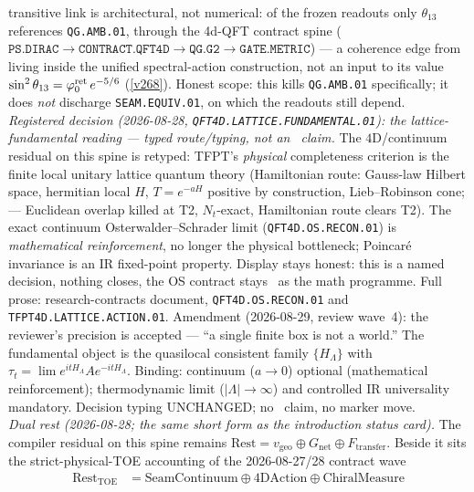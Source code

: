 \begin{keybox}
transitive link is architectural, not numerical: of the frozen readouts only $\theta_{13}$ references
\texttt{QG.AMB.01}, through the 4d-QFT contract spine
($\texttt{PS.DIRAC}{\to}\texttt{CONTRACT.QFT4D}{\to}\texttt{QG.G2}{\to}\texttt{GATE.METRIC}$) --- a
coherence edge from living inside the unified spectral-action construction, not an input to its value
$\sin^2\theta_{13}=\varphi_0^{\mathrm{ret}}\,e^{-5/6}$ (\vref{v268}). Honest scope: this kills \texttt{QG.AMB.01}
specifically; it does \emph{not} discharge \texttt{SEAM.EQUIV.01}, on which the readouts still depend.
\smallskip\\
\noindent\emph{Registered decision (2026-08-28, \texttt{QFT4D.LATTICE.FUNDAMENTAL.01}):
the lattice-fundamental reading --- typed route/typing, not an \mE\ claim.}
The $4$D/continuum residual on this spine is retyped: TFPT's \emph{physical} completeness
criterion is the finite local unitary lattice quantum theory (Hamiltonian route: Gauss-law
Hilbert space, hermitian local $H$, $T=e^{-aH}$ positive by construction,
Lieb--Robinson cone; 
--- Euclidean overlap killed at T2, $N_t$-exact, Hamiltonian route clears T2).  The exact
continuum Osterwalder--Schrader limit (\texttt{QFT4D.OS.RECON.01}) is \emph{mathematical
reinforcement}, no longer the physical bottleneck; Poincar\'e invariance is an IR fixed-point
property.  Display stays honest: this is a named decision, nothing closes, the OS contract
stays \mO\ as the math programme.  Full prose: research-contracts document,
\texttt{QFT4D.OS.RECON.01} and \texttt{TFPT4D.LATTICE.ACTION.01}.
Amendment (2026-08-29, review wave~4): the reviewer's precision is accepted ---
``a single finite box is not a world.''
The fundamental object is the quasilocal consistent family $\{H_\Lambda\}$ with
$\tau_t=\lim e^{itH_\Lambda}A e^{-itH_\Lambda}$.
Binding: continuum ($a\to0$) optional (mathematical reinforcement); thermodynamic
limit ($|\Lambda|\to\infty$) and controlled IR universality mandatory.
Decision typing UNCHANGED; no \mE\ claim, no marker move.
\smallskip\\
\noindent\emph{Dual rest (2026-08-28; the same short form as the introduction status card).}
The compiler residual on this spine remains $\mathrm{Rest}=v_{\mathrm{geo}}\oplus G_{\mathrm{net}}\oplus F_{\mathrm{transfer}}$.
Beside it sits the strict-physical-TOE accounting of the 2026-08-27/28 contract wave
\[
  \begin{aligned}
  \mathrm{Rest}_{\mathrm{TOE}}
    &=\mathrm{SeamContinuum}\oplus\mathrm{4DAction}\oplus\mathrm{ChiralMeasure}\\

\end{aligned}\]
\end{keybox}
